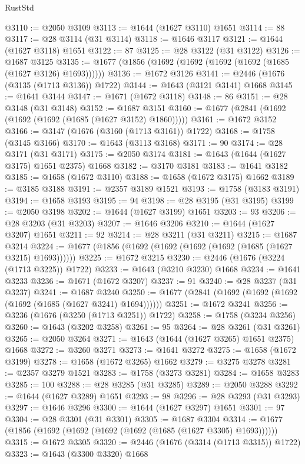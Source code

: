 \begin{lexlean}{RustStd}
\begin{coremodule}
@3110 := @2050 @3109
@3113 := @1644 (@1627 @3110) @1651
@3114 := 88
@3117 := @28 @3114 (@31 @3114)
@3118 := @1646 @3117
@3121 := @1644 (@1627 @3118) @1651
@3122 := 87
@3125 := @28 @3122 (@31 @3122)
@3126 := @1687 @3125
@3135 := @1677 (@1856 (@1692 (@1692 (@1692 (@1692 (@1685 (@1627 @3126) @1693))))))
@3136 := @1672 @3126
@3141 := @2446 (@1676 (@3135 (@1713 @3136)) @1722)
@3144 := @1643 (@3121 @3141) @1668
@3145 := @1641 @3144
@3147 := @1671 (@1672 @3118)
@3148 := 86
@3151 := @28 @3148 (@31 @3148)
@3152 := @1687 @3151
@3160 := @1677 (@2841 (@1692 (@1692 (@1692 (@1685 (@1627 @3152) @1860)))))
@3161 := @1672 @3152
@3166 := @3147 (@1676 (@3160 (@1713 @3161)) @1722)
@3168 := @1758 (@3145 @3166)
@3170 := @1643 (@3113 @3168)
@3171 := 90
@3174 := @28 @3171 (@31 @3171)
@3175 := @2050 @3174
@3181 := @1643 (@1644 (@1627 @3175) @1651 @2375) @1668
@3182 := @3170 @3181
@3183 := @1641 @3182
@3185 := @1658 (@1672 @3110)
@3188 := @1658 (@1672 @3175) @1662
@3189 := @3185 @3188
@3191 := @2357 @3189 @1521
@3193 := @1758 (@3183 @3191)
@3194 := @1658 @3193
@3195 := 94
@3198 := @28 @3195 (@31 @3195)
@3199 := @2050 @3198
@3202 := @1644 (@1627 @3199) @1651
@3203 := 93
@3206 := @28 @3203 (@31 @3203)
@3207 := @1646 @3206
@3210 := @1644 (@1627 @3207) @1651
@3211 := 92
@3214 := @28 @3211 (@31 @3211)
@3215 := @1687 @3214
@3224 := @1677 (@1856 (@1692 (@1692 (@1692 (@1692 (@1685 (@1627 @3215) @1693))))))
@3225 := @1672 @3215
@3230 := @2446 (@1676 (@3224 (@1713 @3225)) @1722)
@3233 := @1643 (@3210 @3230) @1668
@3234 := @1641 @3233
@3236 := @1671 (@1672 @3207)
@3237 := 91
@3240 := @28 @3237 (@31 @3237)
@3241 := @1687 @3240
@3250 := @1677 (@2841 (@1692 (@1692 (@1692 (@1692 (@1685 (@1627 @3241) @1694))))))
@3251 := @1672 @3241
@3256 := @3236 (@1676 (@3250 (@1713 @3251)) @1722)
@3258 := @1758 (@3234 @3256)
@3260 := @1643 (@3202 @3258)
@3261 := 95
@3264 := @28 @3261 (@31 @3261)
@3265 := @2050 @3264
@3271 := @1643 (@1644 (@1627 @3265) @1651 @2375) @1668
@3272 := @3260 @3271
@3273 := @1641 @3272
@3275 := @1658 (@1672 @3199)
@3278 := @1658 (@1672 @3265) @1662
@3279 := @3275 @3278
@3281 := @2357 @3279 @1521
@3283 := @1758 (@3273 @3281)
@3284 := @1658 @3283
@3285 := 100
@3288 := @28 @3285 (@31 @3285)
@3289 := @2050 @3288
@3292 := @1644 (@1627 @3289) @1651
@3293 := 98
@3296 := @28 @3293 (@31 @3293)
@3297 := @1646 @3296
@3300 := @1644 (@1627 @3297) @1651
@3301 := 97
@3304 := @28 @3301 (@31 @3301)
@3305 := @1687 @3304
@3314 := @1677 (@1856 (@1692 (@1692 (@1692 (@1692 (@1685 (@1627 @3305) @1693))))))
@3315 := @1672 @3305
@3320 := @2446 (@1676 (@3314 (@1713 @3315)) @1722)
@3323 := @1643 (@3300 @3320) @1668

\end{coremodule}
\end{lexlean}
